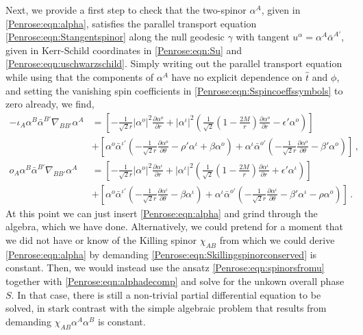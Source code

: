 Next, we provide a first step to check that the two-spinor $\alpha^A$, given in \eqref{Penrose:eqn:alpha}, satisfies the
parallel transport equation \eqref{Penrose:eqn:Stangentspinor} along the null geodesic $\gamma$ with tangent $u^{\alpha} =
\alpha^A \bar{\alpha}^{A'} $, given in Kerr-Schild coordinates in \eqref{Penrose:eqn:Su} and \eqref{Penrose:eqn:uschwarzschild}.
Simply writing out the parallel transport equation while using that the components of $\alpha^A$ have no explicit
dependence on $\hat{t}$ and $\phi$, and setting the vanishing spin coefficients in \eqref{Penrose:eqn:Sspincoeffssymbols}
to zero already, we find,
\begin{equation}\label{Penrose:eqn:Salphaequations}
\begin{aligned}
-\iota_A	\alpha^B \bar{\alpha}^{B'} \nabla_{BB'}\alpha^A &= \left\lbrack -\frac{1}{\sqrt{2} r} |\alpha^o|^2  \frac{\partial \alpha^o}{\partial r} + |\alpha^{\iota}|^2 \left( \frac{1}{\sqrt{2}} \left(1-\frac{2M}{r}\right) \frac{\partial \alpha^{o}}{\partial r} - \epsilon' \alpha^{o}\right) \right \rbrack \\
&+  \left\lbrack \alpha^o\bar{\alpha}^{\iota'} \left(-\frac{1}{\sqrt{2} r}\frac{\partial \alpha^o}{\partial \theta} -\rho' \alpha^{\iota} + \beta \alpha^o \right)+  \alpha^{\iota}\bar{\alpha}^{o'} \left(-\frac{1}{\sqrt{2} r}\frac{\partial \alpha^o}{\partial \theta} -\beta' \alpha^o \right) \right\rbrack \, , \\
o_A	\alpha^B \bar{\alpha}^{B'} \nabla_{BB'}\alpha^A &= \left\lbrack -\frac{1}{\sqrt{2} r}|\alpha^o|^2  \frac{\partial \alpha^{\iota}}{\partial r} + |\alpha^{\iota}|^2 \left( \frac{1}{\sqrt{2}} \left(1-\frac{2M}{r}\right) \frac{\partial \alpha^{\iota}}{\partial r} + \epsilon' \alpha^{\iota}\right) \right \rbrack  \\
&+ \left\lbrack \alpha^o\bar{\alpha}^{\iota'} \left(-\frac{1}{\sqrt{2} r}\frac{\partial \alpha^{\iota}}{\partial \theta} -\beta \alpha^{\iota}\right)+  \alpha^{\iota}\bar{\alpha}^{o'} \left(-\frac{1}{\sqrt{2} r}\frac{\partial \alpha^{\iota}}{\partial \theta} -\beta' \alpha^{\iota} - \rho \alpha^o \right) \right\rbrack \, .
\end{aligned}
\end{equation}
At this point we can just insert \eqref{Penrose:eqn:alpha} and grind through the algebra, which we have done. Alternatively, we could pretend for a moment that we did not have or know of the Killing spinor $\chi_{AB}$ from which we could derive \eqref{Penrose:eqn:alpha} by demanding \eqref{Penrose:eqn:Skillingspinorconserved} is constant. Then, we would instead use the ansatz \eqref{Penrose:eqn:spinorsfromu} together with  \eqref{Penrose:eqn:alphadecomp} and solve for the unkown overall phase $S$. In that case, there is still a non-trivial partial differential equation to be solved, in stark contrast with the simple algebraic problem that results from demanding $\chi_{AB}\alpha^A \alpha^B$ is constant.

